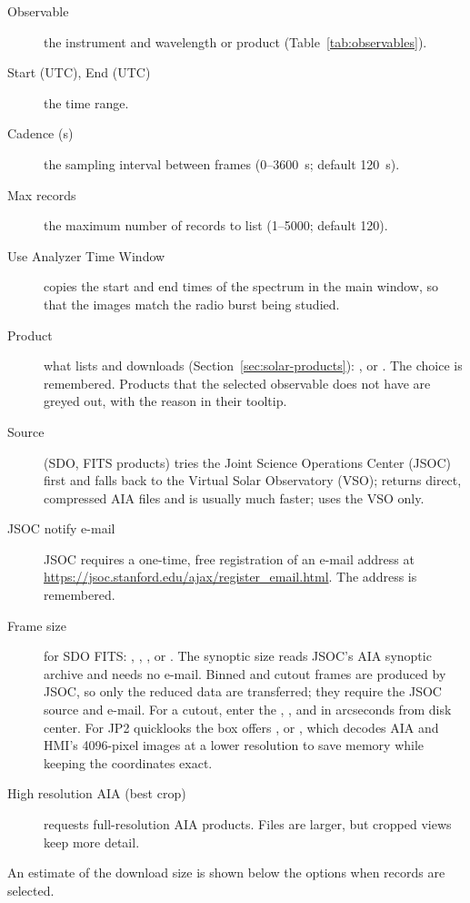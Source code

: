 \begin{description}
  \item[Observable] the instrument and wavelength or product (Table~\ref{tab:observables}).
  \item[Start (UTC), End (UTC)] the time range.
  \item[Cadence (s)] the sampling interval between frames (0--3600~s; default 120~s).
  \item[Max records] the maximum number of records to list (1--5000; default 120).
  \item[Use Analyzer Time Window] copies the start and end times of the spectrum in the main
    window, so that the images match the radio burst being studied.
\end{description}

\begin{description}
  \item[Product] what  lists and  downloads
    (Section~\ref{sec:solar-products}): ,  or . The choice is remembered. Products that the
    selected observable does not have are greyed out, with the reason in their tooltip.
  \item[Source] (SDO, FITS products)  tries the Joint Science Operations Center (JSOC)
    first and falls back to the Virtual Solar Observatory (VSO);  returns
    direct, compressed AIA files and is usually much faster;  uses the
    VSO only.
  \item[JSOC notify e-mail] JSOC requires a one-time, free registration of an e-mail address
    at \url{https://jsoc.stanford.edu/ajax/register_email.html}. The address is remembered.
  \item[Frame size] for SDO FITS: , , ,  or . The synoptic size reads JSOC's AIA synoptic
    archive and needs no e-mail. Binned and cutout frames are produced by JSOC, so only the
    reduced data are transferred; they require the JSOC source and e-mail. For a cutout,
    enter the , ,  and  in arcseconds
    from disk center. For JP2 quicklooks the box offers , 
    or , which decodes AIA and HMI's 4096-pixel images at a lower resolution
    to save memory while keeping the coordinates exact.
  \item[High resolution AIA (best crop)] requests full-resolution AIA products. Files are
    larger, but cropped views keep more detail.
\end{description}
An estimate of the download size is shown below the options when records are selected.

